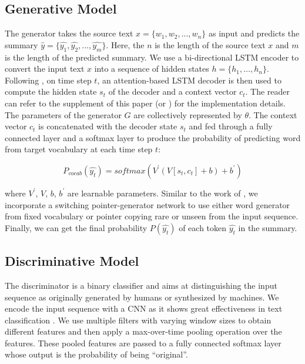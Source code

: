 \documentclass[letterpaper]{article} \usepackage{aaai18}  \usepackage{times}  \usepackage{helvet}  \usepackage{courier}  \usepackage{url}  \usepackage{graphicx}  \frenchspacing  \usepackage{multirow}
\begin{document}
\subsection{Generative Model}
The generator takes the source text $x=\{w_{1}, w_{2}, ..., w_{n}\}$ as input and predicts the summary $\hat{y} =\{\hat{y_{1}}, \hat{y_{2}}, ..., \hat{y_{m}}\}$. Here, the $n$ is the length of the source text $x$ and $m$ is the length of the predicted summary. We use a bi-directional LSTM encoder to convert the input text $x$ into a sequence of hidden states $h=\{h_{1},\dots,h_{n}\}$.  Following \cite{see2017get}, on time step $t$, an attention-based LSTM decoder is then used to compute the hidden state $s_t$ of the decoder and a context vector $c_t$.  The reader can refer to the supplement of this paper (or  \cite{see2017get}) for the implementation details. The parameters of the generator $G$ are collectively represented by $\theta$.  The context vector $c_t$ is concatenated with the decoder state $s_t$ and fed through a fully connected layer and a softmax layer to produce the  probability of predicting word from target vocabulary at each time step $t$:
{\footnotesize

	\begin{equation}
	{ P_{vocab}(\hat{y_t}) = softmax(V^{'}(V[s_{t}, c_{t}] + b) + b^{'}) } \nonumber
	\end{equation}
    
}
where $V^{'}$,  $V$, $b$, $b^{'}$ are learnable parameters.  Similar to the work of \cite{see2017get}, we incorporate a switching pointer-generator network to use either word generator from fixed vocabulary or pointer copying rare or unseen from the input sequence. Finally, we can get the final probability $P(\hat{y_t})$ of each token $\hat{y_t}$ in the summary. 

\subsection{Discriminative Model}

The discriminator is a binary classifier and aims at distinguishing the input sequence as originally generated by humans or synthesized by machines. We encode the input sequence with a CNN as it shows great effectiveness in text classification \cite{kim2014convolutional}. We use multiple filters with varying window sizes to obtain different features and then apply a max-over-time pooling operation over the features. These pooled features are passed to a fully connected softmax layer whose output is the probability of being “original”. 
\end{document}
